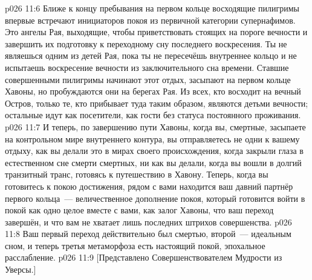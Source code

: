 \vs p026 11:6 \pc Ближе к концу пребывания на первом кольце восходящие пилигримы впервые встречают инициаторов покоя из первичной категории супернафимов. Это ангелы Рая, выходящие, чтобы приветствовать стоящих на пороге вечности и завершить их подготовку к переходному сну последнего воскресения. Ты не являешься одним из детей Рая, пока ты не пересечёшь внутреннее кольцо и не испытаешь воскресение вечности из заключительного сна времени. Ставшие совершенными пилигримы начинают этот отдых, засыпают на первом кольце Хавоны, но пробуждаются они на берегах Рая. Из всех, кто восходит на вечный Остров, только те, кто прибывает туда таким образом, являются детьми вечности; остальные идут как посетители, как гости без статуса постоянного проживания.
\vs p026 11:7 И теперь, по завершению пути Хавоны, когда вы, смертные, засыпаете на контрольном мире внутреннего контура, вы отправляетесь не одни к вашему отдыху, как вы делали это в мирах своего происхождения, когда закрыли глаза в естественном сне смерти смертных, ни как вы делали, когда вы вошли в долгий транзитный транс, готовясь к путешествию в Хавону. Теперь, когда вы готовитесь к покою достижения, рядом с вами находится ваш давний партнёр первого кольца~--- величественное дополнение покоя, который готовится войти в покой как одно целое вместе с вами, как залог Хавоны, что ваш переход завершён, и что вам не хватает лишь последних штрихов совершенства.
\vs p026 11:8 Ваш первый переход действительно был смертью, второй~--- идеальным сном, и теперь третья метаморфоза есть настоящий покой, эпохальное расслабление.
\vsetoff
\vs p026 11:9 [Представлено Совершенствователем Мудрости из Уверсы.]
\quizlink
